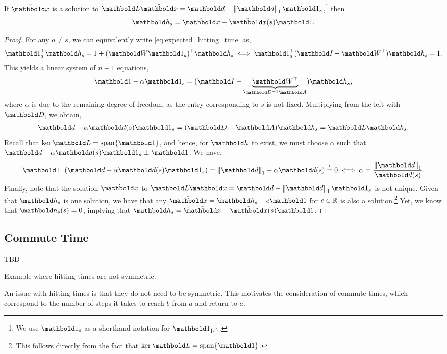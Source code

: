 \begin{lem}
If $\elx$ is a solution to $\mL\elx = \vd - \norm{\vd}_1 \vOne_s$,\footnote{We use $\vOne_s$ as a shorthand notation for $\vOne_{\{s\}}$.} then \begin{align}
    \vh_s = \elx - \elx(s)\vOne.
\end{align}
\end{lem}
\begin{proof}
For any $a \neq s$, we can equivalently write \cref{eq:expected_hitting_time} as, \begin{align*}
    \trans{\vOne_a}\vh_s = 1 + \trans{(\mW \vOne_a)}\vh_s \iff \trans{\vOne_a}(\mI - \trans{\mW})\vh_s = 1.
\end{align*} This yields a linear system of $n-1$ equations, \begin{align}
    \vOne - \alpha \vOne_s = (\mI - \underbrace{\trans{\mW}}_{\inv{\mD}\mA})\vh_s,
\end{align} where $\alpha$ is due to the remaining degree of freedom, as the entry corresponding to $s$ is not fixed. Multiplying from the left with $\mD$, we obtain, \begin{align*}
    \vd - \alpha \vd(s) \vOne_s = (\mD - \mA)\vh_s = \mL\vh_s.
\end{align*} Recall that $\ker{\mL} = \vspan\{\vOne\}$, and hence, for $\vh$ to exist, we must choose $\alpha$ such that $\vd - \alpha \vd(s) \vOne_s \perp \vOne$. We have, \begin{align*}
    \trans{\vOne}(\vd - \alpha \vd(s) \vOne_s) = \norm{\vd}_1 - \alpha \vd(s) \overset{!}{=} 0 \iff \alpha = \frac{\norm{\vd}_1}{\vd(s)}.
\end{align*} Finally, note that the solution $\elx$ to $\mL\elx = \vd - \norm{\vd}_1 \vOne_s$ is not unique. Given that $\vh_s$ is one solution, we have that any $\elx = \vh_s + c\vOne$ for $c \in \mathbb{R}$ is also a solution.\footnote{This follows directly from the fact that $\ker{\mL} = \vspan\{\vOne\}$.} Yet, we know that $\vh_s(s) = 0$, implying that $\vh_s = \elx - \elx(s)\vOne$.
\end{proof}

\subsection{Commute Time}

\begin{marginfigure}
TBD
\caption{Example where hitting times are not symmetric.}
\end{marginfigure}
An issue with hitting times is that they do not need to be symmetric. This motivates the consideration of commute times, which correspond to the number of steps it takes to reach $b$ from $a$ and return to $a$.

